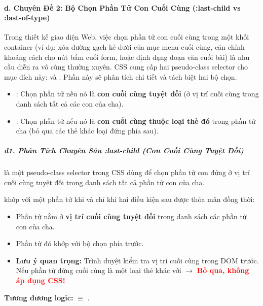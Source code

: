 \paragraph{d. Chuyên Đề 2: Bộ Chọn Phần Tử Con Cuối Cùng (:last-child vs :last-of-type)}

Trong thiết kế giao diện Web, việc chọn phần tử con cuối cùng trong một khối container (ví dụ: xóa đường gạch kẻ dưới của mục menu cuối cùng, căn chỉnh khoảng cách cho nút bấm cuối form, hoặc định dạng đoạn văn cuối bài) là nhu cầu diễn ra vô cùng thường xuyên. CSS cung cấp hai pseudo-class selector cho mục đích này:  và . Phần này sẽ phân tích chi tiết và tách biệt hai bộ chọn.

\begin{conceptBox}
\begin{itemize}[leftmargin=1.5em, itemsep=3pt, parsep=0pt]
    \item {}: Chọn phần tử nếu nó là \textbf{con cuối cùng tuyệt đối} (ở vị trí cuối cùng trong danh sách tất cả các con của cha).
    \item {}: Chọn phần tử nếu nó là \textbf{con cuối cùng thuộc loại thẻ đó} trong phần tử cha (bỏ qua các thẻ khác loại đứng phía sau).
\end{itemize}
\end{conceptBox}


\subparagraph{d1. Phân Tích Chuyên Sâu :last-child (Con Cuối Cùng Tuyệt Đối)}

 là một pseudo-class selector trong CSS dùng để chọn phần tử con đứng ở vị trí cuối cùng tuyệt đối trong danh sách tất cả phần tử con của cha.

\begin{conceptBox}
 khớp với một phần tử khi và chỉ khi hai điều kiện sau được thỏa mãn đồng thời:
\begin{itemize}[leftmargin=1.5em, itemsep=2pt, parsep=0pt]
    \item Phần tử nằm ở \textbf{vị trí cuối cùng tuyệt đối} trong danh sách các phần tử con của cha.
    \item Phần tử đó khớp với bộ chọn  phía trước.
    \item \textbf{Lưu ý quan trọng:} Trình duyệt kiểm tra vị trí cuối cùng trong DOM trước. Nếu phần tử đứng cuối cùng là một loại thẻ khác với  $\rightarrow$ \textcolor{red}{\textbf{Bỏ qua, không áp dụng CSS!}}
\end{itemize}
\par\vspace{4pt}
\textbf{Tương đương logic:}  $\equiv$ .
\end{conceptBox}

